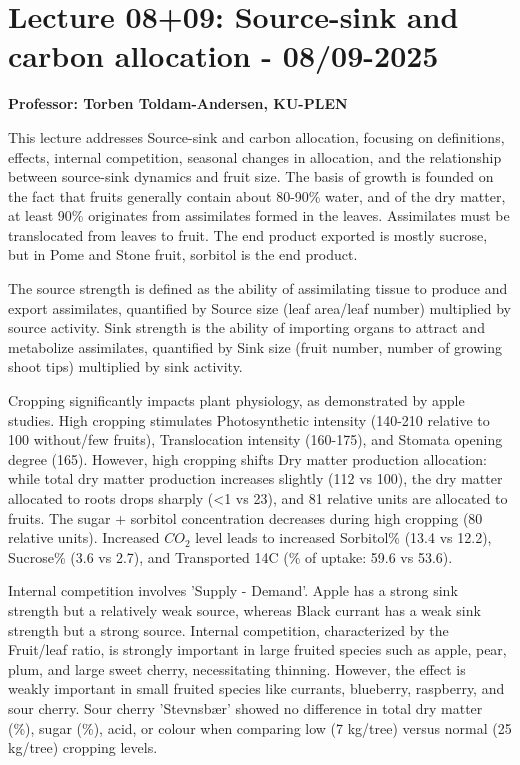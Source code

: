 \section{Lecture 08+09: Source-sink and carbon allocation - 08/09-2025}
\textbf{Professor: Torben Toldam-Andersen, KU-PLEN}

\vspace{1em}
This lecture addresses Source-sink and carbon allocation, focusing on definitions, effects, internal competition, seasonal changes in allocation, and the relationship between source-sink dynamics and fruit size. The basis of growth is founded on the fact that fruits generally contain about 80-90\% water, and of the dry matter, at least 90\% originates from assimilates formed in the leaves. Assimilates must be translocated from leaves to fruit. The end product exported is mostly sucrose, but in Pome and Stone fruit, sorbitol is the end product.

\vspace{0.5em}
The source strength is defined as the ability of assimilating tissue to produce and export assimilates, quantified by Source size (leaf area/leaf number) multiplied by source activity. Sink strength is the ability of importing organs to attract and metabolize assimilates, quantified by Sink size (fruit number, number of growing shoot tips) multiplied by sink activity.

\vspace{0.5em}
Cropping significantly impacts plant physiology, as demonstrated by apple studies. High cropping stimulates Photosynthetic intensity (140-210 relative to 100 without/few fruits), Translocation intensity (160-175), and Stomata opening degree (165). However, high cropping shifts Dry matter production allocation: while total dry matter production increases slightly (112 vs 100), the dry matter allocated to roots drops sharply (<1 vs 23), and 81 relative units are allocated to fruits. The sugar + sorbitol concentration decreases during high cropping (80 relative units). Increased $CO_2$ level leads to increased Sorbitol\% (13.4 vs 12.2), Sucrose\% (3.6 vs 2.7), and Transported 14\textdegree C (\% of uptake: 59.6 vs 53.6).

\vspace{0.5em}
Internal competition involves 'Supply - Demand'. Apple has a strong sink strength but a relatively weak source, whereas Black currant has a weak sink strength but a strong source. Internal competition, characterized by the Fruit/leaf ratio, is strongly important in large fruited species such as apple, pear, plum, and large sweet cherry, necessitating thinning. However, the effect is weakly important in small fruited species like currants, blueberry, raspberry, and sour cherry. Sour cherry 'Stevnsbær' showed no difference in total dry matter (\%), sugar (\%), acid, or colour when comparing low (7 kg/tree) versus normal (25 kg/tree) cropping levels.

